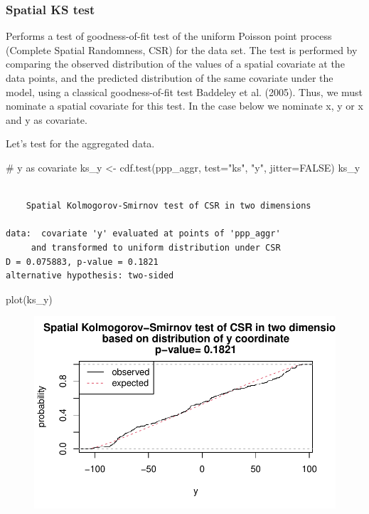 \documentclass[
  letterpaper,
  DIV=11,
  numbers=noendperiod]{scrreprt}
\newenvironment{Shaded}{\begin{snugshade}}{\end{snugshade}}
\newcommand{\AttributeTok}[1]{\textcolor[rgb]{0.40,0.45,0.13}{#1}}
\newcommand{\CommentTok}[1]{\textcolor[rgb]{0.37,0.37,0.37}{#1}}
\newcommand{\ConstantTok}[1]{\textcolor[rgb]{0.56,0.35,0.01}{#1}}
\newcommand{\FunctionTok}[1]{\textcolor[rgb]{0.28,0.35,0.67}{#1}}
\newcommand{\NormalTok}[1]{\textcolor[rgb]{0.00,0.23,0.31}{#1}}
\newcommand{\OtherTok}[1]{\textcolor[rgb]{0.00,0.23,0.31}{#1}}
\newcommand{\StringTok}[1]{\textcolor[rgb]{0.13,0.47,0.30}{#1}}
\begin{document}
\hypertarget{spatial-ks-test}{%
\subsubsection{Spatial KS test}\label{spatial-ks-test}}

Performs a test of goodness-of-fit test of the uniform Poisson point
process (Complete Spatial Randomness, CSR) for the data set. The test is
performed by comparing the observed distribution of the values of a
spatial covariate at the data points, and the predicted distribution of
the same covariate under the model, using a classical goodness-of-fit
test Baddeley et al. (2005). Thus, we must nominate a spatial covariate
for this test. In the case below we nominate x, y or x and y as
covariate.

Let's test for the aggregated data.

\begin{Shaded}
\begin{Highlighting}[]
\CommentTok{\# y as covariate}
\NormalTok{ks\_y }\OtherTok{\textless{}{-}} \FunctionTok{cdf.test}\NormalTok{(ppp\_aggr, }\AttributeTok{test=}\StringTok{"ks"}\NormalTok{, }\StringTok{"y"}\NormalTok{, }\AttributeTok{jitter=}\ConstantTok{FALSE}\NormalTok{)}
\NormalTok{ks\_y}
\end{Highlighting}
\end{Shaded}

\begin{verbatim}

    Spatial Kolmogorov-Smirnov test of CSR in two dimensions

data:  covariate 'y' evaluated at points of 'ppp_aggr' 
     and transformed to uniform distribution under CSR
D = 0.075883, p-value = 0.1821
alternative hypothesis: two-sided
\end{verbatim}

\begin{Shaded}
\begin{Highlighting}[]
\FunctionTok{plot}\NormalTok{(ks\_y)}
\end{Highlighting}
\end{Shaded}

\begin{figure}[H]

{\centering \includegraphics{spatial-tests_files/figure-pdf/unnamed-chunk-36-1.pdf}

}

\end{figure}
\end{document}

